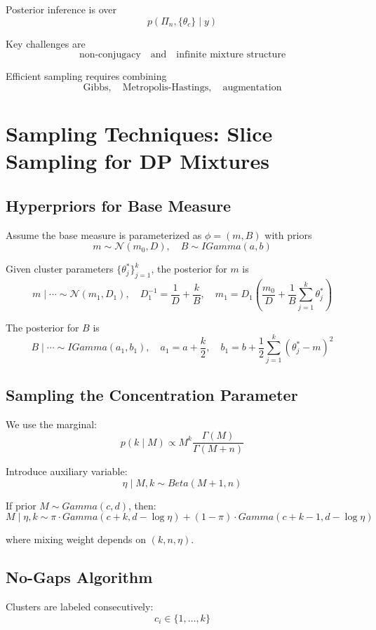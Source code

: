 \documentclass[12pt,oneside]{book}
\numberwithin{equation}{section}
\theoremstyle{definition}
\theoremstyle{plain}
\theoremstyle{remark}
\begin{document}
Posterior inference is over
\[
p(\Pi_n, \{\theta_c\} \mid y)
\]

Key challenges are
\[
\text{non-conjugacy} \quad \text{and} \quad \text{infinite mixture structure}
\]

Efficient sampling requires combining
\[
\text{Gibbs}, \quad \text{Metropolis-Hastings}, \quad \text{augmentation}
\]

\section{Sampling Techniques: Slice Sampling for DP Mixtures}

\subsection*{Hyperpriors for Base Measure}

Assume the base measure is parameterized as $\phi = (m,B)$ with priors
\[
m \sim \mathcal{N}(m_0, D), \quad B \sim IGamma(a,b)
\]

Given cluster parameters $\{\theta_j^*\}_{j=1}^k$, the posterior for $m$ is
\[
m \mid \cdots \sim \mathcal{N}(m_1, D_1),
\quad
D_1^{-1} = \frac{1}{D} + \frac{k}{B},
\quad
m_1 = D_1\left(\frac{m_0}{D} + \frac{1}{B}\sum_{j=1}^k \theta_j^*\right)
\]

The posterior for $B$ is
\[
B \mid \cdots \sim IGamma(a_1, b_1),
\quad
a_1 = a + \frac{k}{2},
\quad
b_1 = b + \frac{1}{2}\sum_{j=1}^k (\theta_j^* - m)^2
\]

\subsection*{Sampling the Concentration Parameter}

We use the marginal:
\[
p(k \mid M) \propto M^k \frac{\Gamma(M)}{\Gamma(M+n)}
\]

Introduce auxiliary variable:
\[
\eta \mid M,k \sim Beta(M+1, n)
\]

If prior $M \sim Gamma(c,d)$, then:
\[
M \mid \eta,k \sim
\pi \cdot Gamma(c+k, d - \log \eta)
+
(1-\pi) \cdot Gamma(c+k-1, d - \log \eta)
\]

where mixing weight depends on $(k,n,\eta)$.

\subsection*{No-Gaps Algorithm}

Clusters are labeled consecutively:
\[
c_i \in \{1,\dots,k\}
\]
\end{document}
